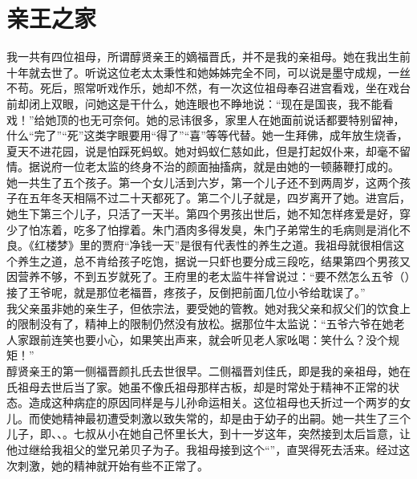 \fancyhead[RO]{} %
\fancyhead[LE]{} %
\chapter*{亲王之家}
\thispagestyle{empty}
我一共有四位祖母，所谓醇贤亲王的嫡福晋氏，并不是我的亲祖母。她在我出生前十年就去世了。听说这位老太太秉性和她姊姊完全不同，可以说是墨守成规，一丝不苟。死后，照常听戏作乐，她却不然，有一次这位祖母奉召进宫看戏，坐在戏台前却闭上双眼，问她这是干什么，她连眼也不睁地说：“现在是国丧，我不能看戏！”给她顶的也无可奈何。她的忌讳很多，家里人在她面前说话都要特别留神，什么“完了”“死”这类字眼要用“得了”“喜”等等代替。她一生拜佛，成年放生烧香，夏天不进花园，说是怕踩死蚂蚁。她对蚂蚁仁慈如此，但是打起奴仆来，却毫不留情。据说府一位老太监的终身不治的颜面抽搐病，就是由她的一顿藤鞭打成的。\\

她一共生了五个孩子。第一个女儿活到六岁，第一个儿子还不到两周岁，这两个孩子在五年冬天相隔不过二十天都死了。第二个儿子就是，四岁离开了她。进宫后，她生下第三个儿子，只活了一天半。第四个男孩出世后，她不知怎样疼爱是好，穿少了怕冻着，吃多了怕撑着。朱门酒肉多得发臭，朱门子弟常生的毛病则是消化不良。《红楼梦》里的贾府“净钱一天”是很有代表性的养生之道。我祖母就很相信这个养生之道，总不肯给孩子吃饱，据说一只虾也要分成三段吃，结果第四个男孩又因营养不够，不到五岁就死了。王府里的老太监牛祥曾说过：“要不然怎么五爷（）接了王爷呢，就是那位老福晋，疼孩子，反倒把前面几位小爷给耽误了。”\\

我父亲虽非她的亲生子，但依宗法，要受她的管教。她对我父亲和叔父们的饮食上的限制没有了，精神上的限制仍然没有放松。据那位牛太监说：“五爷六爷在她老人家跟前连笑也要小心，如果笑出声来，就会听见老人家吆喝：笑什么？没个规矩！”\\

醇贤亲王的第一侧福晋颜扎氏去世很早。二侧福晋刘佳氏，即是我的亲祖母，她在氏祖母去世后当了家。她虽不像氏祖母那样古板，却是时常处于精神不正常的状态。造成这种病症的原因同样是与儿孙命运相关。这位祖母也夭折过一个两岁的女儿。而使她精神最初遭受刺激以致失常的，却是由于幼子的出嗣。她一共生了三个儿子，即、、。七叔从小在她自己怀里长大，到十一岁这年，突然接到太后旨意，让他过继给我祖父的堂兄弟贝子为子。我祖母接到这个“”，直哭得死去活来。经过这次刺激，她的精神就开始有些不正常了。\\

